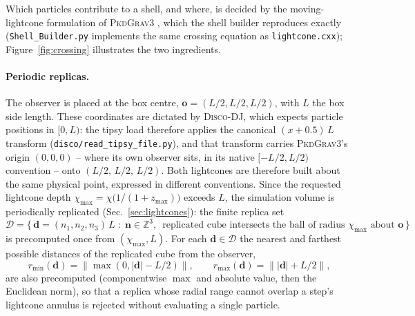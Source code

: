 \documentclass{report}
\begin{document}
Which particles contribute to a shell, and where, is decided by the moving-lightcone formulation of \textsc{PkdGrav3} \cite{noauthor_examplepkdgrav3_lightcone_2022}, which the shell builder reproduces exactly (\texttt{Shell\_Builder.py} implements the same crossing equation as \texttt{lightcone.cxx}); Figure~\ref{fig:crossing} illustrates the two ingredients.

\paragraph{Periodic replicas.}
The observer is placed at the box centre, \mbox{$\mathbf{o} = (L/2, L/2, L/2)$}, with \mbox{$L$} the box side length. These coordinates are dictated by \textsc{Disco-DJ}, which expects particle positions in \mbox{$[0, L)$}: the tipsy load therefore applies the canonical \mbox{$(x + 0.5)\,L$} transform (\texttt{disco/read\_tipsy\_file.py}), and that transform carries \textsc{PkdGrav3}'s origin $(0,0,0)$ -- where its own observer sits, in its native \mbox{$[-L/2, L/2)$} convention -- onto \mbox{$(L/2,\,L/2,\,L/2)$}. Both lightcones are therefore built about the same physical point, expressed in different conventions. Since the requested lightcone depth $\chi_{\max} = \chi\big(1/(1+z_{\max})\big)$ exceeds $L$, the simulation volume is periodically replicated (Sec.~\ref{sec:lightcones}): the finite replica set
\begin{equation}
  \mathcal{D} = \Big\{\, \mathbf{d} = (n_1, n_2, n_3)\,L \;:\; \mathbf{n}\in\mathbb{Z}^3, \ \; \text{replicated cube intersects the ball of radius } \chi_{\max} \text{ about } \mathbf{o} \,\Big\}
  \label{eq:replica_set}
\end{equation}
is precomputed once from $(\chi_{\max}, L)$. For each $\mathbf{d}\in\mathcal{D}$ the nearest and farthest possible distances of the replicated cube from the observer,
\begin{equation}
  r_{\min}(\mathbf{d}) = \big\lVert \max(0, |\mathbf{d}| - L/2) \big\rVert, \qquad
  r_{\max}(\mathbf{d}) = \big\lVert |\mathbf{d}| + L/2 \big\rVert,
  \label{eq:replica_bounds}
\end{equation}
are also precomputed (componentwise $\max$ and absolute value, then the Euclidean norm), so that a replica whose radial range cannot overlap a step's lightcone annulus is rejected without evaluating a single particle.
\end{document}
